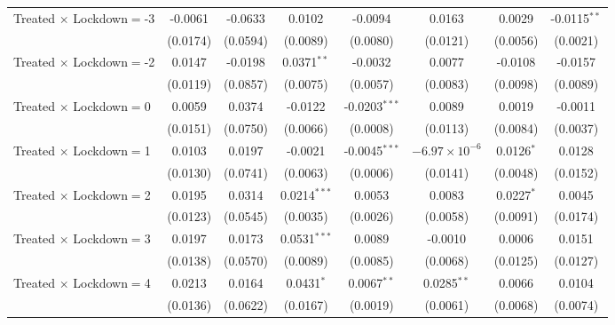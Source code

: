 \begin{tabular}{lccccccc}
   Treated $\times$ Lockdown$=$-3 & -0.0061       & -0.0633       & 0.0102          & -0.0094         & 0.0163                 & 0.0029        & -0.0115$^{**}$\\
                                   & (0.0174)      & (0.0594)      & (0.0089)        & (0.0080)        & (0.0121)               & (0.0056)      & (0.0021)\\
   Treated $\times$ Lockdown$=$-2 & 0.0147        & -0.0198       & 0.0371$^{**}$   & -0.0032         & 0.0077                 & -0.0108       & -0.0157\\
                                   & (0.0119)      & (0.0857)      & (0.0075)        & (0.0057)        & (0.0083)               & (0.0098)      & (0.0089)\\
   Treated $\times$ Lockdown$=$0  & 0.0059        & 0.0374        & -0.0122         & -0.0203$^{***}$ & 0.0089                 & 0.0019        & -0.0011\\
                                   & (0.0151)      & (0.0750)      & (0.0066)        & (0.0008)        & (0.0113)               & (0.0084)      & (0.0037)\\
   Treated $\times$ Lockdown$=$1  & 0.0103        & 0.0197        & -0.0021         & -0.0045$^{***}$ & $-6.97\times 10^{-6}$ & 0.0126$^{*}$  & 0.0128\\
                                   & (0.0130)      & (0.0741)      & (0.0063)        & (0.0006)        & (0.0141)               & (0.0048)      & (0.0152)\\
   Treated $\times$ Lockdown$=$2  & 0.0195        & 0.0314        & 0.0214$^{***}$  & 0.0053          & 0.0083                 & 0.0227$^{*}$  & 0.0045\\
                                   & (0.0123)      & (0.0545)      & (0.0035)        & (0.0026)        & (0.0058)               & (0.0091)      & (0.0174)\\
   Treated $\times$ Lockdown$=$3  & 0.0197        & 0.0173        & 0.0531$^{***}$  & 0.0089          & -0.0010                & 0.0006        & 0.0151\\
                                   & (0.0138)      & (0.0570)      & (0.0089)        & (0.0085)        & (0.0068)               & (0.0125)      & (0.0127)\\
   Treated $\times$ Lockdown$=$4  & 0.0213        & 0.0164        & 0.0431$^{*}$    & 0.0067$^{**}$   & 0.0285$^{**}$          & 0.0066        & 0.0104\\
                                   & (0.0136)      & (0.0622)      & (0.0167)        & (0.0019)        & (0.0061)               & (0.0068)      & (0.0074)\\

\end{tabular}
